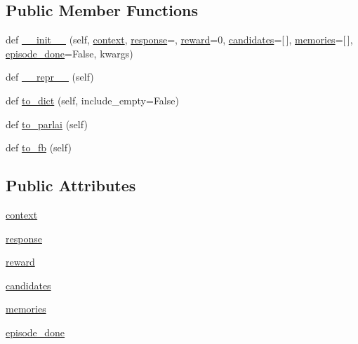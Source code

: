 \subsection*{Public Member Functions}
\begin{DoxyCompactItemize}
\item 
def \hyperlink{classself__feeding_1_1utils_1_1Parley_aeda0932760261f607b8725914e37a75c}{\+\_\+\+\_\+init\+\_\+\+\_\+} (self, \hyperlink{classself__feeding_1_1utils_1_1Parley_af9775ca31a96e392ff557c9ae59fe473}{context}, \hyperlink{classself__feeding_1_1utils_1_1Parley_aa1f1d6581b6aa107659005af86b69dad}{response}=\textquotesingle{}\textquotesingle{}, \hyperlink{classself__feeding_1_1utils_1_1Parley_a039021fbe9ced8e0053966cf48f1a32e}{reward}=0, \hyperlink{classself__feeding_1_1utils_1_1Parley_a5c197e261eeb326bd8f38afa228aafa8}{candidates}=\mbox{[}$\,$\mbox{]}, \hyperlink{classself__feeding_1_1utils_1_1Parley_ab9f2039de89de42c9e63bb5bfd119581}{memories}=\mbox{[}$\,$\mbox{]}, \hyperlink{classself__feeding_1_1utils_1_1Parley_a414815c0cc1270c732461edacbb5e000}{episode\+\_\+done}=False, kwargs)
\item 
def \hyperlink{classself__feeding_1_1utils_1_1Parley_ac5399cb4416ce38da77f36c54896dbde}{\+\_\+\+\_\+repr\+\_\+\+\_\+} (self)
\item 
def \hyperlink{classself__feeding_1_1utils_1_1Parley_a7b58d117171ba87eabd5e7d6e3a02517}{to\+\_\+dict} (self, include\+\_\+empty=False)
\item 
def \hyperlink{classself__feeding_1_1utils_1_1Parley_a84e024a69f13007c1ba1ba1b93497ab5}{to\+\_\+parlai} (self)
\item 
def \hyperlink{classself__feeding_1_1utils_1_1Parley_a1d651fb1702af3ec617c362e4bda625f}{to\+\_\+fb} (self)
\end{DoxyCompactItemize}
\subsection*{Public Attributes}
\begin{DoxyCompactItemize}
\item 
\hyperlink{classself__feeding_1_1utils_1_1Parley_af9775ca31a96e392ff557c9ae59fe473}{context}
\item 
\hyperlink{classself__feeding_1_1utils_1_1Parley_aa1f1d6581b6aa107659005af86b69dad}{response}
\item 
\hyperlink{classself__feeding_1_1utils_1_1Parley_a039021fbe9ced8e0053966cf48f1a32e}{reward}
\item 
\hyperlink{classself__feeding_1_1utils_1_1Parley_a5c197e261eeb326bd8f38afa228aafa8}{candidates}
\item 
\hyperlink{classself__feeding_1_1utils_1_1Parley_ab9f2039de89de42c9e63bb5bfd119581}{memories}
\item 
\hyperlink{classself__feeding_1_1utils_1_1Parley_a414815c0cc1270c732461edacbb5e000}{episode\+\_\+done}
\end{DoxyCompactItemize}


